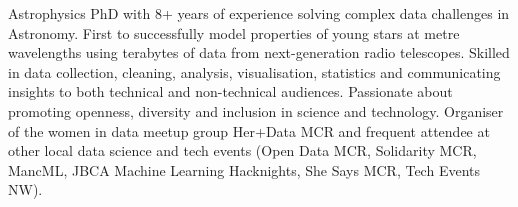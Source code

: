  \vspace{-6pt}

\begin{cvpubs}
  \cvpub
    {
      \begin{cvlist}
  \item {Astrophysics PhD with 8+ years of experience solving complex data challenges in Astronomy. First to successfully model properties of young stars at metre wavelengths using terabytes of data from next-generation radio telescopes. Skilled in data collection, cleaning, analysis, visualisation, statistics and communicating insights to both technical and non-technical audiences. Passionate about promoting openness, diversity and inclusion in science and technology. Organiser of the women in data meetup group Her+Data MCR and frequent attendee at other local data science and tech events (Open Data MCR, Solidarity MCR, MancML, JBCA Machine Learning Hacknights, She Says MCR, Tech Events NW).}
      \end{cvlist}
    }
\vspace{-11pt}
\end{cvpubs}

